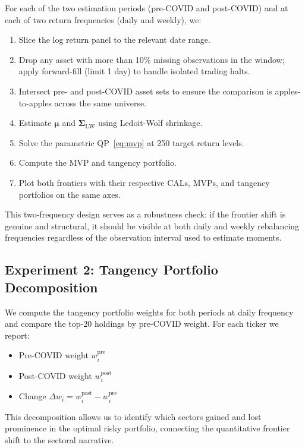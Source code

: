 \documentclass[12pt,a4paper]{article}
\begin{document}
For each of the two estimation periods (pre-COVID and post-COVID) and at each of
two return frequencies (daily and weekly), we:
\begin{enumerate}[label=\arabic*.]
    \item Slice the log return panel to the relevant date range.
    \item Drop any asset with more than 10\% missing observations in the window; apply
        forward-fill (limit 1 day) to handle isolated trading halts.
    \item Intersect pre- and post-COVID asset sets to ensure the comparison is
        apples-to-apples across the same universe.
    \item Estimate $\boldsymbol{\mu}$ and $\boldsymbol{\Sigma}_{\text{LW}}$ using
        Ledoit-Wolf shrinkage.
    \item Solve the parametric QP~\eqref{eq:mvp} at 250 target return levels.
    \item Compute the MVP and tangency portfolio.
    \item Plot both frontiers with their respective CALs, MVPs, and tangency portfolios
        on the same axes.
\end{enumerate}

This two-frequency design serves as a robustness check: if the frontier shift is genuine
and structural, it should be visible at both daily and weekly rebalancing frequencies
regardless of the observation interval used to estimate moments.

\subsection{Experiment 2: Tangency Portfolio Decomposition}

We compute the tangency portfolio weights for both periods at daily frequency and
compare the top-20 holdings by pre-COVID weight. For each ticker we report:
\begin{itemize}
    \item Pre-COVID weight $w_i^{\text{pre}}$
    \item Post-COVID weight $w_i^{\text{post}}$
    \item Change $\Delta w_i = w_i^{\text{post}} - w_i^{\text{pre}}$
\end{itemize}
This decomposition allows us to identify which sectors gained and lost prominence in
the optimal risky portfolio, connecting the quantitative frontier shift to the sectoral
narrative.
\end{document}
